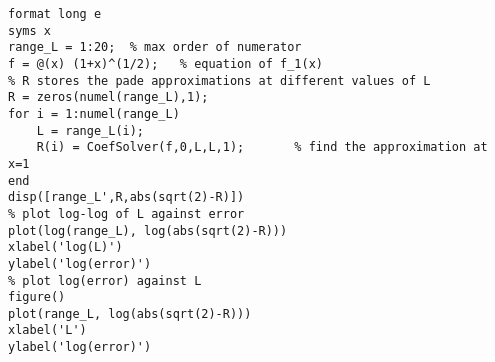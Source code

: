 \lstset{basicstyle=\footnotesize,style=myCustomMatlabStyle}
\begin{lstlisting}
format long e
syms x
range_L = 1:20;  % max order of numerator
f = @(x) (1+x)^(1/2);   % equation of f_1(x)
% R stores the pade approximations at different values of L
R = zeros(numel(range_L),1);
for i = 1:numel(range_L)
    L = range_L(i);
    R(i) = CoefSolver(f,0,L,L,1);       % find the approximation at x=1
end
disp([range_L',R,abs(sqrt(2)-R)])
% plot log-log of L against error
plot(log(range_L), log(abs(sqrt(2)-R)))
xlabel('log(L)')
ylabel('log(error)')
% plot log(error) against L
figure()
plot(range_L, log(abs(sqrt(2)-R)))
xlabel('L')
ylabel('log(error)')


\end{lstlisting}